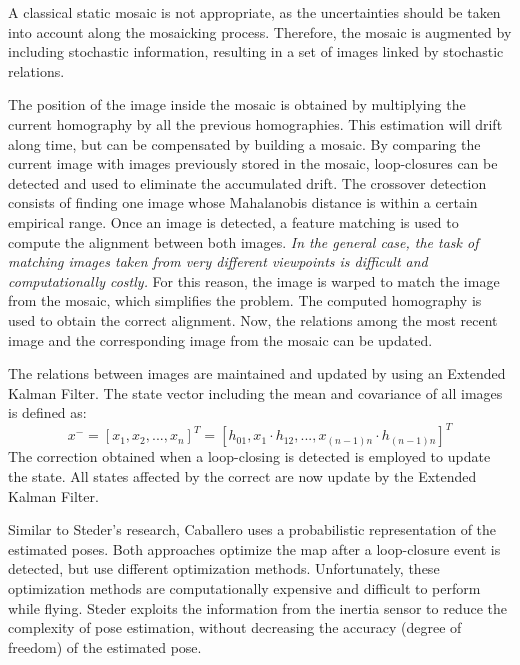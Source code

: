 A classical static mosaic is not appropriate, as the uncertainties should be taken into account along the mosaicking process.
Therefore, the mosaic is augmented by including stochastic information, resulting in a set of images linked by stochastic relations.

The position of the image inside the mosaic is obtained by multiplying the current homography by all the previous homographies.
This estimation will drift along time, but can be compensated by building a mosaic.
By comparing the current image with images previously stored in the mosaic, loop-closures can be detected and used to eliminate the accumulated drift.
The crossover detection consists of finding one image whose Mahalanobis distance is within a certain empirical range.
Once an image is detected, a feature matching is used to compute the alignment between both images. 
\textit{In the general case, the task of matching images taken from very different viewpoints is difficult and computationally costly.}
For this reason, the image is warped to match the image from the mosaic, which simplifies the problem.
The computed homography is used to obtain the correct alignment.
Now, the relations among the most recent image and the corresponding image from the mosaic can be updated.

The relations between images are maintained and updated by using an Extended Kalman Filter.
The state vector including the mean and covariance of all images is defined as:
\begin{equation}
x^{-} = [x_1, x_2, ..., x_n]^T = [h_{01}, x_1 \cdot h_{12}, ..., x_{(n-1)n} \cdot h_{(n-1)n}]^T
\end{equation}
The correction obtained when a loop-closing is detected is employed to update the state.
All states affected by the correct are now update by the Extended Kalman Filter.

Similar to Steder's research, Caballero uses a probabilistic representation of the estimated poses.
Both approaches optimize the map after a loop-closure event is detected, but use different optimization methods.
Unfortunately, these optimization methods are computationally expensive and difficult to perform while flying.
Steder exploits the information from the inertia sensor to reduce the complexity of pose estimation, without decreasing the accuracy (degree of freedom) of the estimated pose.



